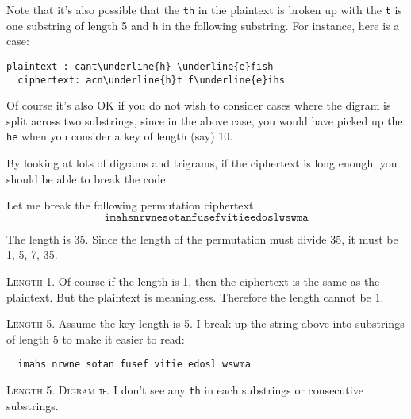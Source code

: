 Note that it's also possible that the \verb!th! in the plaintext
is broken up with the \verb!t! is one substring of length 5
and \verb!h! in the following substring.
For instance, here is a case:
\begin{Verbatim}[commandchars=\\\{\}]
  plaintext : cant\underline{h} \underline{e}fish         
  ciphertext: acn\underline{h}t f\underline{e}ihs
\end{Verbatim}
Of course it's also OK if you do not wish to consider cases where the
digram is split across two substrings, since in the above case,
you would have picked up the \verb!he! when you consider a key of length (say) 10.

By looking at lots of digrams and trigrams, if the ciphertext is long enough, you
should be able to break the code.

\newpage
\begin{eg}
  Let me break the following permutation ciphertext
\[
  \texttt{imahsnrwnesotanfusefvitieedoslwswma}
\]
\end{eg}

\SOLUTION

The length is 35. Since the length of the permutation must divide 35,
it must be 1, 5, 7, 35.


\textsc{Length 1.}
Of course if the length is 1, then the ciphertext is the same as the
plaintext. But the plaintext is meaningless. Therefore the length
cannot be 1.

\textsc{Length 5.}
Assume the key length is 5.
I break up the string
above into substrings of length 5 to make it easier to read:
\begin{Verbatim}
  imahs nrwne sotan fusef vitie edosl wswma
\end{Verbatim}


\textsc{Length 5. Digram \texttt{th}.}
I don't see any \verb!th! in each substrings or consecutive substrings.


